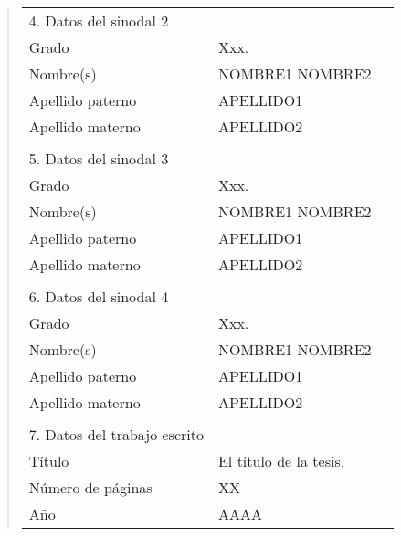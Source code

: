 \begin{quote}
\begin{tabular}{lll}
%
4. Datos del sinodal 2       &                                         \\
Grado                        & Xxx.                                    \\
Nombre(s)                    & NOMBRE1 NOMBRE2                         \\
Apellido paterno             & APELLIDO1                               \\
Apellido materno             & APELLIDO2                               \\
                             &                                         \\
%
%
5. Datos del sinodal 3       &                                         \\
Grado                        & Xxx.                                    \\
Nombre(s)                    & NOMBRE1 NOMBRE2                         \\
Apellido paterno             & APELLIDO1                               \\
Apellido materno             & APELLIDO2                               \\
                             &                                         \\
%
6. Datos del sinodal 4       &                                         \\
Grado                        & Xxx.                                    \\
Nombre(s)                    & NOMBRE1 NOMBRE2                         \\
Apellido paterno             & APELLIDO1                               \\
Apellido materno             & APELLIDO2                               \\
                             &                                         \\
%
7. Datos del trabajo escrito &                                         \\
Título                       & El título de la tesis.                  \\
Número de páginas            & XX                                      \\
Año                          & AAAA                                    \\
%
\end{tabular}
\end{quote}
